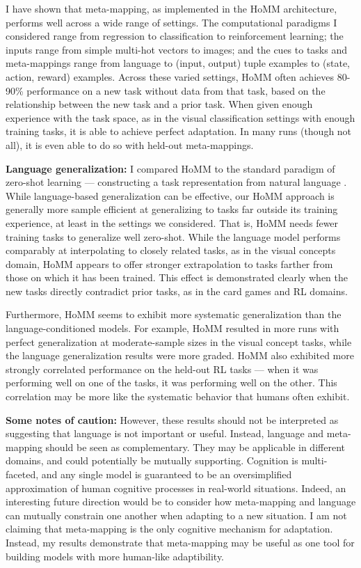 I have shown that meta-mapping, as implemented in the HoMM architecture, performs well across a wide range of settings. The computational paradigms I considered range from regression to classification to reinforcement learning; the inputs range from simple multi-hot vectors to images; and the cues to tasks and meta-mappings range from language to (input, output) tuple examples to (state, action, reward) examples. Across these varied settings, HoMM often achieves 80-90\% performance on a new task without data from that task, based on the relationship between the new task and a prior task. When given enough experience with the task space, as in the visual classification settings with enough training tasks, it is able to achieve perfect adaptation. In many runs (though not all), it is even able to do so with held-out meta-mappings. \par

\textbf{Language generalization:} I compared HoMM to the standard paradigm of zero-shot learning --- constructing a task representation from natural language \citep[e.g.][also see below]{Larochelle2008}. While language-based generalization can be effective, our HoMM approach is generally more sample efficient at generalizing to tasks far outside its training experience, at least in the settings we considered. That is, HoMM needs fewer training tasks to generalize well zero-shot. While the language model performs comparably at interpolating to closely related tasks, as in the visual concepts domain, HoMM appears to offer stronger extrapolation to tasks farther from those on which it has been trained. This effect is demonstrated clearly when the new tasks directly contradict prior tasks, as in the card games and RL domains.\par

Furthermore, HoMM seems to exhibit more systematic generalization than the language-conditioned models. For example, HoMM resulted in more runs with perfect generalization at moderate-sample sizes in the visual concept tasks, while the language generalization results were more graded. HoMM also exhibited more strongly correlated performance on the held-out RL tasks --- when it was performing well on one of the tasks, it was performing well on the other. This correlation may be more like the systematic behavior that humans often exhibit. \par

\textbf{Some notes of caution:} However, these results should not be interpreted as suggesting that language is not important or useful. Instead, language and meta-mapping should be seen as complementary. They may be applicable in different domains, and could potentially be mutually supporting. Cognition is multi-faceted, and any single model is guaranteed to be an oversimplified approximation of human cognitive processes in real-world situations. Indeed, an interesting future direction would be to consider how meta-mapping and language can mutually constrain one another when adapting to a new situation. I am not claiming that meta-mapping is the only cognitive mechanism for adaptation. Instead, my results demonstrate that meta-mapping may be useful as one tool for building models with more human-like adaptibility.  \par

